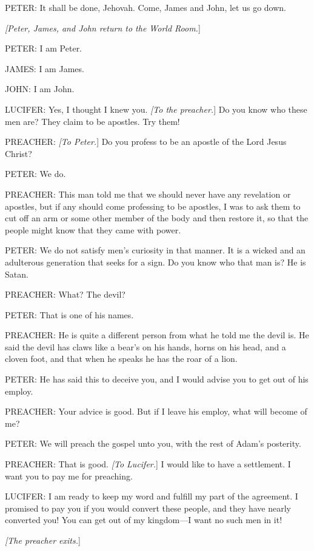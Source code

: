			PETER: It shall be done, Jehovah. Come, James and John, let us go down.
			
			\textit{[Peter, James, and John return to the World Room.}]

			PETER: I am Peter.

			JAMES: I am James.

			JOHN: I am John.

			LUCIFER: Yes, I thought I knew you. \textit{[To the preacher.}] Do you know who these men are? They claim to be apostles. Try them!

			PREACHER: \textit{[To Peter.}] Do you profess to be an apostle of the Lord Jesus Christ?

			PETER: We do.

			PREACHER: This man told me that we should never have any revelation or apostles, but if any should come professing to be apostles, I was to ask them to cut off an arm or some other member of the body and then restore it, so that the people might know that they came with power.

			PETER: We do not satisfy men's curiosity in that manner. It is a wicked and an adulterous generation that seeks for a sign. Do you know who that man is? He is Satan.

			PREACHER: What? The devil?

			PETER: That is one of his names.

			PREACHER: He is quite a different person from what he told me the devil is. He said the devil has claws like a bear's on his hands, horns on his head, and a cloven foot, and that when he speaks he has the roar of a lion.

			PETER: He has said this to deceive you, and I would advise you to get out of his employ.

			PREACHER: Your advice is good. But if I leave his employ, what will become of me?

			PETER: We will preach the gospel unto you, with the rest of Adam's posterity.

			PREACHER: That is good. \textit{[To Lucifer.}] I would like to have a settlement. I want you to pay me for preaching.

			LUCIFER: I am ready to keep my word and fulfill my part of the agreement. I promised to pay you if you would convert these people, and they have nearly converted you! You can get out of my kingdom---I want no such men in it!

			\textit{[The preacher exits.}]
			
